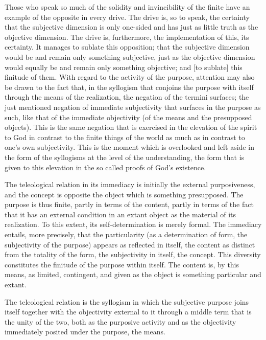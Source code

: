     Those who speak so much of the solidity and invincibility of
    the finite have an example of the opposite in every drive.
    The drive is, so to speak, the certainty that the subjective dimension
    is only one-sided and has just as little truth as the objective dimension.
    The drive is, furthermore, the implementation of this, its certainty.
    It manages to sublate this opposition;
    that the subjective dimension would be and remain only something subjective,
    just as the objective dimension would equally be and remain only something objective;
    and [to sublate] this finitude of them.
    With regard to the activity of the purpose, attention may also be drawn to
    the fact that, in the syllogism that conjoins the purpose with itself
    through the means of the realization, the negation of the termini surfaces;
    the just mentioned negation of immediate subjectivity that surfaces in
    the purpose as such, like that of the immediate objectivity
    (of the means and the presupposed objects).
    This is the same negation that is exercised in the elevation of the spirit to God
    in contrast to the finite things of the world as much as in contrast to
    one's own subjectivity.
    This is the moment which is overlooked and left aside in the form of
    the syllogisms at the level of the understanding,
    the form that is given to this elevation in the so called proofs of God's existence.

The teleological relation in its immediacy is initially the external purposiveness,
and the concept is opposite the object which is something presupposed.
The purpose is thus finite, partly in terms of the content,
partly in terms of the fact that it has an external condition
in an extant object as the material of its realization.
To this extent, its self-determination is merely formal.
The immediacy entails, more precisely, that the particularity
(as a determination of form, the subjectivity of the purpose)
appears as reflected in itself, the content as distinct from
the totality of the form, the subjectivity in itself, the concept.
This diversity constitutes the finitude of the purpose within itself.
The content is, by this means, as limited, contingent, and
given as the object is something particular and extant.

The teleological relation is the syllogism in which the subjective purpose
joins itself together with the objectivity external to it
through a middle term that is the unity of the two,
both as the purposive activity and as the objectivity
immediately posited under the purpose, the means.

